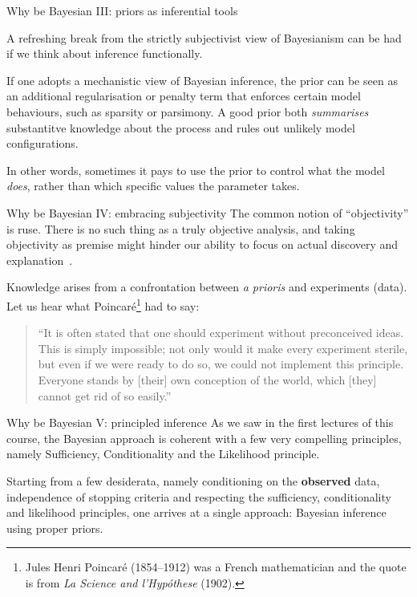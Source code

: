 \begin{frame}{Why be Bayesian III: priors as inferential tools}

A refreshing break from the strictly subjectivist view of Bayesianism can be had if we think about inference functionally. 

 \begin{idea}
 \label{id:prior_tool}
  If one adopts a mechanistic view of Bayesian inference, the prior can be seen as an additional regularisation or penalty term that enforces certain model behaviours, such as sparsity or parsimony.
  A good prior both \textit{summarises} substantitve knowledge about the process and rules out unlikely model configurations.
 \end{idea}

 In other words, sometimes it pays to use the prior to control what the model \textit{does}, rather than which specific values the parameter takes.
 
 \end{frame}
\begin{frame}{Why be Bayesian IV: embracing subjectivity}
The common notion of ``objectivity'' is ruse.
There is no such thing as a truly objective analysis, and taking objectivity as premise might hinder our ability to focus on actual discovery and explanation~\citep{Hennig2017}.
\begin{idea}
\label{id:subjective}
 Knowledge arises from a confrontation between \textit{a prioris} and experiments (data).
 Let us hear what Poincaré\footnote{Jules Henri Poincaré (1854--1912) was a French mathematician and the quote is from \textit{La Science and l'Hypóthese} (1902).} had to say:
 \begin{quote}
  ``It is often stated that one should experiment without preconceived ideas.
  This is simply impossible; not only would it make every experiment sterile, but even if we were ready to do so, we could not implement this principle. 
  Everyone stands by [their] own conception of the world, which [they] cannot get rid of so easily.''
 \end{quote}
 \end{idea}
\end{frame}
\begin{frame}{Why be Bayesian V: principled inference}
As we saw in the first lectures of this course, the Bayesian approach is coherent with a few very compelling principles, namely Sufficiency, Conditionality and the Likelihood principle.
\begin{idea}
Starting from a few desiderata, namely conditioning on the \textbf{observed} data, independence of stopping criteria and respecting the sufficiency, conditionality and  likelihood principles, one arrives at a single approach: Bayesian inference using proper priors.
 \label{id:principled_inference}
\end{idea}
 \end{frame}
